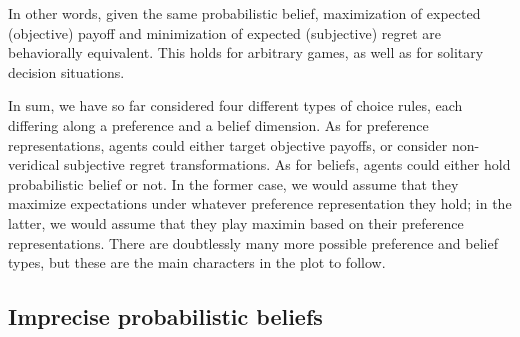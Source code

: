 \documentclass[fleqn,reqno,11pt]{article}
\begin{document}
\noindent In other words, given the same probabilistic belief, maximization of expected
(objective) payoff and minimization of expected (subjective) regret are behaviorally
equivalent. This holds for arbitrary games, as well as for solitary decision situations.

\bigskip

In sum, we have so far considered four different types of choice rules, each differing along a
preference and a belief dimension. As for preference representations, agents could either
target objective payoffs, or consider non-veridical subjective regret transformations. As for
beliefs, agents could either hold probabilistic belief or not. In the former case, we would
assume that they maximize expectations under whatever preference representation they hold; in
the latter, we would assume that they play maximin based on their preference
representations. There are doubtlessly many more possible preference and belief types, but
these are the main characters in the plot to follow. 

\newpage

\subsection{Imprecise probabilistic beliefs}
\label{sec:impr-prob-beli}
\end{document}
